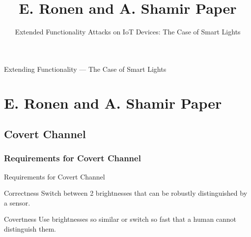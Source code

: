 \documentclass[11pt,t,usepdftitle=false,aspectratio=169]{beamer}
\begin{document}
\begin{frame}{Extending Functionality --- The Case of Smart Lights}
\end{frame}

\title{E. Ronen and A. Shamir Paper}
\subtitle{Extended Functionality Attacks on IoT Devices: The Case of Smart Lights}
\section{E. Ronen and A. Shamir Paper}

\subsection{Covert Channel}%
\label{sub:covert_channel}

\subsubsection{Requirements for Covert Channel}%
\label{sub:requirements_for_covert_channel}
\begin{frame}{Requirements for Covert Channel}
	\begin{block}{Correctness}
		Switch between 2 brightnesses that can be robustly distinguished by a sensor.
	\end{block}
	\begin{block}{Covertness}
		Use brightnesses so similar or switch so fast that a human cannot distinguish them.
	\end{block}
	

\end{frame}
\end{document}
